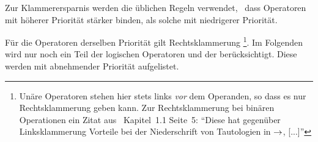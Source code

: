 Zur Klammerersparnis werden die üblichen Regeln verwendet, \textdh\ dass Operatoren mit höherer Priorität stärker binden, als solche mit niedrigerer Priorität.

Für die Operatoren derselben Priorität gilt Rechtsklammerung%
\footnote{%
	Unäre Operatoren stehen hier stets links \emph{vor} dem Operanden, so dass es nur Rechtsklammerung geben kann.
	Zur Rechtsklammerung bei binären Operationen ein Zitat aus~\cite{bib:Rautenberg} Kapitel~1.1 Seite~5:
	\enquote{Diese hat gegenüber Linksklammerung Vorteile
		bei der Niederschrift von Tautologien in $\operatorname{\rightarrow}$, [...]}%
}.
Im Folgenden wird nur noch ein Teil der logischen Operatoren  und der   berücksichtigt.
Diese werden  mit abnehmender Priorität aufgelistet.

